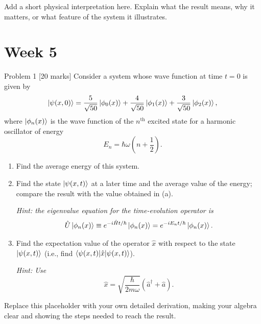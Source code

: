 \documentclass[12pt]{article}
\newif\ifsolutions
\begin{document}
\begin{insightbox}
	Add a short physical interpretation here. Explain what the result means, why it matters, or what feature of the system it illustrates.
\end{insightbox}
\fi


\newpage
\section{Week 5}

\begin{problembox}{Problem 1 \hfill [20 marks]}
Consider a system whose wave function at time $t=0$ is given by
\[
\ket{\psi(x,0)}=
\frac{5}{\sqrt{50}}\ket{\phi_0(x)}
+\frac{4}{\sqrt{50}}\ket{\phi_1(x)}
+\frac{3}{\sqrt{50}}\ket{\phi_2(x)},
\]
where $\ket{\phi_n(x)}$ is the wave function of the $n^{\mathrm{th}}$ excited state for a harmonic oscillator of energy
\[
E_n=\hbar\omega\left(n+\frac{1}{2}\right).
\]

\begin{enumerate}
    \item Find the average energy of this system.
    \item Find the state $\ket{\psi(x,t)}$ at a later time and the average value of the energy; compare the result with the value obtained in (a).

    \textit{Hint: the eigenvalue equation for the time-evolution operator is}
    \[
    \hat{U}\ket{\phi_n(x)}\equiv e^{-i\hat{H}t/\hbar}\ket{\phi_n(x)}
    =e^{-iE_nt/\hbar}\ket{\phi_n(x)}.
    \]

    \item Find the expectation value of the operator $\hat{x}$ with respect to the state $\ket{\psi(x,t)}$ (i.e., find $\braket{\psi(x,t)|\hat{x}|\psi(x,t)}$).

    \textit{Hint: Use}
    \[
    \hat{x}=\sqrt{\frac{\hbar}{2m\omega}}\left(\hat{a}^{\dagger}+\hat{a}\right).
    \]
\end{enumerate}
\end{problembox}

\ifsolutions
\begin{solutionbox}
	Replace this placeholder with your own detailed derivation, making your algebra clear and showing the steps needed to reach the result.
\end{solutionbox}
\end{document}
